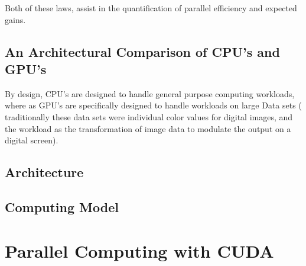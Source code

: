 Both of these laws, assist in the quantification of parallel efficiency and
expected gains.



\subsection{An Architectural Comparison of CPU's and GPU's}

By design, CPU's are designed to handle general purpose computing workloads, where as GPU's are
specifically designed to handle workloads on large Data sets ( traditionally these
data sets were individual color values for digital images, and the workload as
the transformation of image data to modulate the output on a digital screen).
\subsection{Architecture}
\subsection{Computing Model}

\section{Parallel Computing with CUDA}
